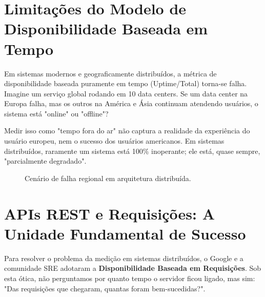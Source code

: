 \documentclass[12pt,a4paper,twoside]{report}
\begin{document}
\section{Limitações do Modelo de Disponibilidade Baseada em Tempo}

Em sistemas modernos e geograficamente distribuídos, a métrica de disponibilidade baseada puramente em tempo (Uptime/Total) torna-se falha. Imagine um serviço global rodando em 10 data centers. Se um data center na Europa falha, mas os outros na América e Ásia continuam atendendo usuários, o sistema está "online" ou "offline"?

Medir isso como "tempo fora do ar" não captura a realidade da experiência do usuário europeu, nem o sucesso dos usuários americanos. Em sistemas distribuídos, raramente um sistema está 100\% inoperante; ele está, quase sempre, "parcialmente degradado".

\begin{figure}[h]
    \centering
    \caption{Cenário de falha regional em arquitetura distribuída.}
\end{figure}

\section{APIs REST e Requisições: A Unidade Fundamental de Sucesso}

Para resolver o problema da medição em sistemas distribuídos, o Google e a comunidade SRE adotaram a \textbf{Disponibilidade Baseada em Requisições}. Sob esta ótica, não perguntamos por quanto tempo o servidor ficou ligado, mas sim: "Das requisições que chegaram, quantas foram bem-sucedidas?".
\end{document}

